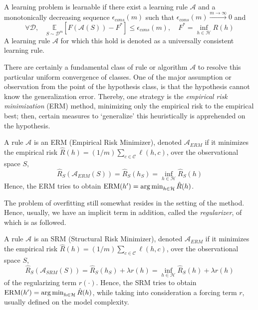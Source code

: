 \documentclass[10pt]{article} %
\begin{document}
\begin{definition}
    A learning problem is learnable if there exist a learning rule $\mathcal{A}$ and a monotonically decreasing sequence $\epsilon_{cons}(m)$ such that $\epsilon_{cons}(m)\overset{m\to\infty}{\longrightarrow} 0$ and \begin{equation}
        \forall \mathcal{D} , \quad \underset{S\sim\mathcal{D}^{m}}{\mathbb{E}} \left[F(\mathcal{A}(S))-F^{*}\right] \leq \epsilon_{cons}(m) , \quad F^{*} = \inf_{h\in\mathcal{H}} R(h)
    \end{equation}
    A learning rule $\mathcal{A}$ for which this hold is denoted as a universally consistent learning rule. 
\end{definition}

There are certainly a fundamental class of rule or algorithm $\mathcal{A}$ to resolve this particular uniform convergence of classes. One of the major assumption or observation from the point of the hypothesis class, is that the hypothesis cannot know the generalization error. Thereby, one strategy is the \textit{empirical risk minimization} (ERM) method, minimizing only the empirical risk to the empirical best; then, certain measures to `generalize' this heuristically is apprehended on the hypothesis. 

\begin{definition}
    A rule $\mathcal{A}$ is an ERM (Empirical Risk Minimizer), denoted $\mathcal{A}_{ERM}$ if it minimizes the empirical risk $\hat{R}(h)=(1/m)\sum_{c\in\mathcal{C}}\ell(h,c)$, over the observational space $S$, 
    \begin{equation}
        \hat{R}_{S}(\mathcal{A}_{ERM}(S)) = \hat{R}_{S} (h_{S}) = \inf_{h\in\mathcal{H}} \hat{R}_{S}(h) 
    \end{equation}
    Hence, the ERM tries to obtain $\mathrm{ERM}(h') = \operatorname*{arg\,min}_{h\in \mathcal{H}} \hat{R}(h)$. 
\end{definition}

The problem of overfitting still somewhat resides in the setting of the method. Hence, usually, we have an implicit term in addition, called the \textit{regularizer}, of which is as followed. 

\begin{definition}
    A rule $\mathcal{A}$ is an SRM (Structural Risk Minimizer), denoted $\mathcal{A}_{ERM}$ if it minimizes the empirical risk $\hat{R}(h)=(1/m)\sum_{c\in\mathcal{C}}\ell(h,c)$, over the observational space $S$, 
    \begin{equation}
        \hat{R}_{S}(\mathcal{A}_{SRM}(S)) = \hat{R}_{S} (h_{S}) + \lambda r(h)= \inf_{h\in\mathcal{H}} \hat{R}_{S}(h) + \lambda r(h)
    \end{equation}
    of the regularizing term $r(\cdot)$. Hence, the SRM tries to obtain $\mathrm{ERM}(h') = \operatorname*{arg\,min}_{h\in \mathcal{H}} \hat{R}(h)$, while taking into consideration a forcing term $r$, usually defined on the model complexity. 
\end{definition}
\end{document}
